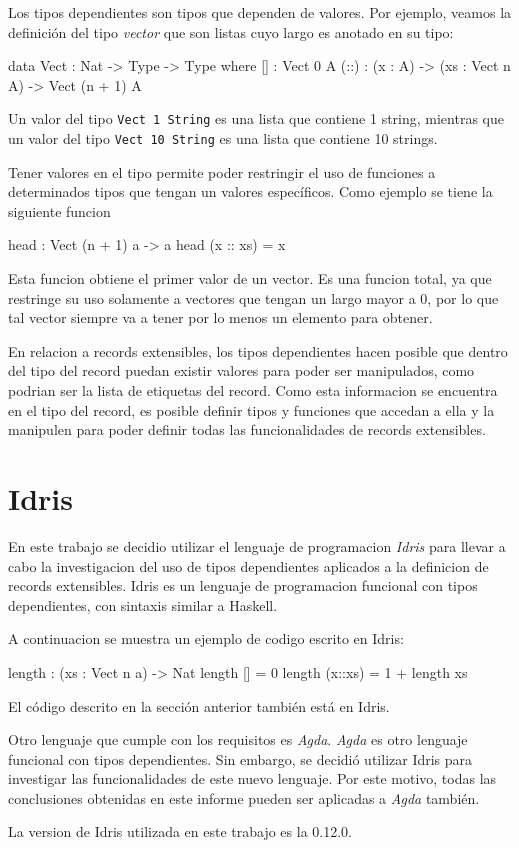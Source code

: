 Los tipos dependientes son tipos que dependen de valores. Por ejemplo, veamos la definición del tipo \textit{vector} que son listas cuyo largo es anotado en su tipo:

\begin{code}
data Vect : Nat -> Type -> Type where
  [] : Vect 0 A
  (::) : (x : A) -> (xs : Vect n A) -> Vect (n + 1) A
\end{code}

Un valor del tipo \texttt{Vect 1 String} es una lista que contiene 1 string, mientras que un valor del tipo \texttt{Vect 10 String} es una lista que contiene 10 strings.

Tener valores en el tipo permite poder restringir el uso de funciones a determinados tipos que tengan un valores específicos. Como ejemplo se tiene la siguiente funcion

\begin{code}
head : Vect (n + 1) a -> a
head (x :: xs) = x
\end{code}

Esta funcion obtiene el primer valor de un vector. Es una funcion total, ya que restringe su uso solamente a vectores que tengan un largo mayor a 0, por lo que tal vector siempre va a tener por lo menos un elemento para obtener.

En relacion a records extensibles, los tipos dependientes hacen posible que dentro del tipo del record puedan existir valores para poder ser manipulados, como podrian ser la lista de etiquetas del record. Como esta informacion se encuentra en el tipo del record, es posible definir tipos y funciones que accedan a ella y la manipulen para poder definir todas las funcionalidades de records extensibles.

\section{Idris}

En este trabajo se decidio utilizar el lenguaje de programacion \textit{Idris} \cite{brady:idris-jfp13} para llevar a cabo la investigacion del uso de tipos dependientes aplicados a la definicion de records extensibles. Idris es un lenguaje de programacion funcional con tipos dependientes, con sintaxis similar a Haskell.

A continuacion se muestra un ejemplo de codigo escrito en Idris:
\begin{code}
length : (xs : Vect n a) -> Nat
length [] = 0
length (x::xs) = 1 + length xs
\end{code}

El código descrito en la sección anterior también está en Idris.

Otro lenguaje que cumple con los requisitos es \textit{Agda}. \textit{Agda} \cite{Norell:2009:DTP:1481861.1481862} es otro lenguaje funcional con tipos dependientes. Sin embargo, se decidió utilizar Idris para investigar las funcionalidades de este nuevo lenguaje.
Por este motivo, todas las conclusiones obtenidas en este informe pueden ser aplicadas a \textit{Agda} también.

La version de Idris utilizada en este trabajo es la 0.12.0.
